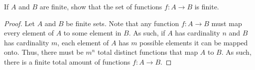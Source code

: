 \documentclass[12pt]{article}
\begin{document}
     If $A$ and $B$ are finite, show that the set of 
    functions $f: A \to B$ is finite.
    \begin{proof}
        Let $A$ and $B$ be finite sets. Note that any function
        $f: A \to B$ must map every element of $A$ to some element
        in $B$. As such, if $A$ has cardinality $n$ and $B$ has cardinality
        $m$, each element of $A$ has $m$ possible elements it can be 
        mapped onto. Thus, there must be $m^n$ total 
        distinct functions that map $A$ to $B$. As such,
        there is a finite total amount of functions $f: A \to B$.
    \end{proof}
\end{document}
